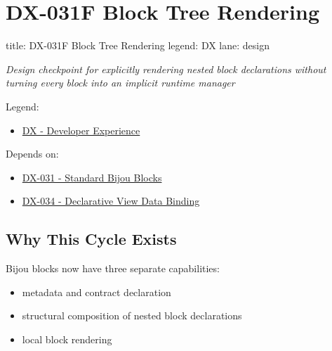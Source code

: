 \chapter{DX-031F Block Tree Rendering}\label{record-129}

\smallskip

\begin{RecordMeta}
title: DX-031F Block Tree Rendering
legend: DX
lane: design

\end{RecordMeta}

\emph{Design checkpoint for explicitly rendering nested block declarations without turning every block into an implicit runtime manager}

Legend:

\begin{itemize}
\tightlist
\item
  \href{https://github.com/flyingrobots/bijou/blob/1853ad902f6bf219326409e7f743a5a1d6517dbc/docs/legends/DX-developer-experience.md}{DX - Developer Experience}
\end{itemize}

Depends on:

\begin{itemize}
\tightlist
\item
  \href{https://github.com/flyingrobots/bijou/blob/cbd70612140e7a450d764b3c7be1c6af878b99bc/docs/design/DX-031-standard-bijou-blocks.md}{DX-031 - Standard Bijou Blocks}
\item
  \href{https://github.com/flyingrobots/bijou/blob/cbd70612140e7a450d764b3c7be1c6af878b99bc/docs/design/DX-034-declarative-view-data-binding.md}{DX-034 - Declarative View Data Binding}
\end{itemize}

\section{Why This Cycle Exists}\label{record-129-why-this-cycle-exists}

Bijou blocks now have three separate capabilities:

\begin{itemize}
\tightlist
\item
  metadata and contract declaration
\item
  structural composition of nested block declarations
\item
  local block rendering
\end{itemize}

